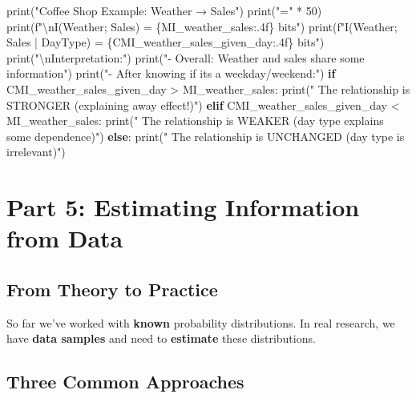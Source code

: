 \documentclass[
  11pt,
  letterpaper,
  oneside,
  openany]{book}
\newenvironment{Shaded}{\begin{snugshade}}{\end{snugshade}}
\newcommand{\BuiltInTok}[1]{\textcolor[rgb]{0.00,0.23,0.31}{#1}}
\newcommand{\CharTok}[1]{\textcolor[rgb]{0.13,0.47,0.30}{#1}}
\newcommand{\ControlFlowTok}[1]{\textcolor[rgb]{0.00,0.23,0.31}{\textbf{#1}}}
\newcommand{\DecValTok}[1]{\textcolor[rgb]{0.68,0.00,0.00}{#1}}
\newcommand{\NormalTok}[1]{\textcolor[rgb]{0.00,0.23,0.31}{#1}}
\newcommand{\OperatorTok}[1]{\textcolor[rgb]{0.37,0.37,0.37}{#1}}
\newcommand{\SpecialCharTok}[1]{\textcolor[rgb]{0.37,0.37,0.37}{#1}}
\newcommand{\SpecialStringTok}[1]{\textcolor[rgb]{0.13,0.47,0.30}{#1}}
\newcommand{\StringTok}[1]{\textcolor[rgb]{0.13,0.47,0.30}{#1}}
\begin{document}
\begin{Shaded}
\begin{Highlighting}[]
\BuiltInTok{print}\NormalTok{(}\StringTok{"Coffee Shop Example: Weather → Sales"}\NormalTok{)}
\BuiltInTok{print}\NormalTok{(}\StringTok{"="} \OperatorTok{*} \DecValTok{50}\NormalTok{)}
\BuiltInTok{print}\NormalTok{(}\SpecialStringTok{f"}\CharTok{\textbackslash{}n}\SpecialStringTok{I(Weather; Sales) = }\SpecialCharTok{\{}\NormalTok{MI\_weather\_sales}\SpecialCharTok{:.4f\}}\SpecialStringTok{ bits"}\NormalTok{)}
\BuiltInTok{print}\NormalTok{(}\SpecialStringTok{f"I(Weather; Sales | DayType) = }\SpecialCharTok{\{}\NormalTok{CMI\_weather\_sales\_given\_day}\SpecialCharTok{:.4f\}}\SpecialStringTok{ bits"}\NormalTok{)}
\BuiltInTok{print}\NormalTok{(}\StringTok{"}\CharTok{\textbackslash{}n}\StringTok{Interpretation:"}\NormalTok{)}
\BuiltInTok{print}\NormalTok{(}\StringTok{"{-} Overall: Weather and sales share some information"}\NormalTok{)}
\BuiltInTok{print}\NormalTok{(}\StringTok{"{-} After knowing if it\textquotesingle{}s a weekday/weekend:"}\NormalTok{)}
\ControlFlowTok{if}\NormalTok{ CMI\_weather\_sales\_given\_day }\OperatorTok{\textgreater{}}\NormalTok{ MI\_weather\_sales:}
    \BuiltInTok{print}\NormalTok{(}\StringTok{"  The relationship is STRONGER (explaining away effect!)"}\NormalTok{)}
\ControlFlowTok{elif}\NormalTok{ CMI\_weather\_sales\_given\_day }\OperatorTok{\textless{}}\NormalTok{ MI\_weather\_sales:}
    \BuiltInTok{print}\NormalTok{(}\StringTok{"  The relationship is WEAKER (day type explains some dependence)"}\NormalTok{)}
\ControlFlowTok{else}\NormalTok{:}
    \BuiltInTok{print}\NormalTok{(}\StringTok{"  The relationship is UNCHANGED (day type is irrelevant)"}\NormalTok{)}
\end{Highlighting}
\end{Shaded}

\section{Part 5: Estimating Information from
Data}\label{part-5-estimating-information-from-data}

\subsection{From Theory to Practice}\label{from-theory-to-practice}

So far we've worked with \textbf{known} probability distributions. In
real research, we have \textbf{data samples} and need to
\textbf{estimate} these distributions.

\subsection{Three Common Approaches}\label{three-common-approaches}
\end{document}
